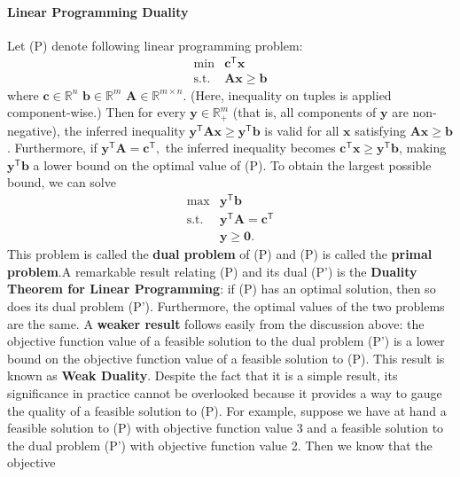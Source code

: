 \paragraph{Linear Programming
Duality}
Let (P) denote following linear programming problem:
\[\begin{array}{rl}
\min & \mathbf{c}^\mathsf{T} \mathbf{x} \\
\mbox{s.t.} & \mathbf{A}\mathbf{x} \geq \mathbf{b}
\end{array}\] where \(\mathbf{c} \in \mathbb{R}^n\)
\(\mathbf{b} \in \mathbb{R}^m\)
\(\mathbf{A} \in \mathbb{R}^{m\times n}.\) (Here, inequality on tuples
is applied component-wise.) Then for every
\(\mathbf{y} \in \mathbb{R}^m_+\) (that is, all components of
\(\mathbf{y}\) are non-negative), the inferred inequality
\(\mathbf{y}^\mathsf{T}\mathbf{A}\mathbf{x} \geq \mathbf{y}^\mathsf{T} \mathbf{b}\)
is valid for all \(\mathbf{x}\) satisfying
\(\mathbf{A}\mathbf{x} \geq \mathbf{b}\). Furthermore, if
\(\mathbf{y}^\mathsf{T}\mathbf{A} = \mathbf{c}^\mathsf{T},\) the
inferred inequality becomes
\(\mathbf{c}^\mathsf{T} \mathbf{x} \geq  \mathbf{y}^\mathsf{T} \mathbf{b}\),
making \(\mathbf{y}^\mathsf{T} \mathbf{b}\) a lower bound on the optimal
value of (P). To obtain the largest possible bound, we can solve
\[\begin{array}{rl}
\max & \mathbf{y}^\mathsf{T} \mathbf{b} \\
\mbox{s.t.} & \mathbf{y}^\mathsf{T} \mathbf{A} = \mathbf{c}^\mathsf{T} \\
& \mathbf{y} \geq \mathbf{0}.
\end{array}\] This problem is called the \textbf{dual problem} of (P) and
(P) is called the \textbf{primal problem}.\newl A remarkable result relating
(P) and its dual (P') is the \textbf{Duality Theorem for Linear Programming}: if (P) has an optimal solution, then so does its dual 
problem (P'). Furthermore, the optimal values of the two problems are the
same.
\newl A \textbf{weaker result} follows easily from the discussion above: the objective function value of a feasible solution to
the dual problem (P') is a lower bound on the objective function value of a
feasible solution to (P).
\newl This result is known as \textbf{Weak Duality}. Despite the fact that it is a
simple result, its significance in practice cannot be overlooked because
it provides a way to gauge the quality of a feasible solution to (P). For example, suppose we have at hand a feasible solution to (P) with
objective function value 3 and a feasible solution to the dual problem (P') 
with objective function value 2. Then we know that the objective

